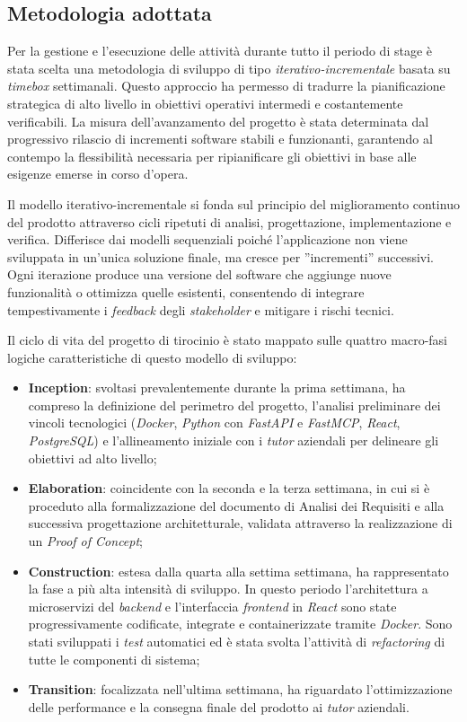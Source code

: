 \subsection{Metodologia adottata}
Per la gestione e l'esecuzione delle attività durante tutto il periodo di stage è stata scelta una metodologia di sviluppo di tipo \textit{iterativo-incrementale} basata su \textit{timebox} settimanali. Questo approccio ha permesso di tradurre la pianificazione strategica di alto livello in obiettivi operativi intermedi e costantemente verificabili. La misura dell'avanzamento del progetto è stata determinata dal progressivo rilascio di incrementi software stabili e funzionanti, garantendo al contempo la flessibilità necessaria per ripianificare gli obiettivi in base alle esigenze emerse in corso d'opera.

Il modello iterativo-incrementale si fonda sul principio del miglioramento continuo del prodotto attraverso cicli ripetuti di analisi, progettazione, implementazione e verifica. Differisce dai modelli sequenziali poiché l'applicazione non viene sviluppata in un'unica soluzione finale, ma cresce per ''incrementi'' successivi. Ogni iterazione produce una versione del software che aggiunge nuove funzionalità o ottimizza quelle esistenti, consentendo di integrare tempestivamente i \textit{feedback} degli \textit{stakeholder} e mitigare i rischi tecnici.

Il ciclo di vita del progetto di tirocinio è stato mappato sulle quattro macro-fasi logiche caratteristiche di questo modello di sviluppo:
\begin{itemize}
\item \textbf{Inception}: svoltasi prevalentemente durante la prima settimana, ha compreso la definizione del perimetro del progetto, l'analisi preliminare dei vincoli tecnologici (\textit{Docker}, \textit{Python} con \textit{FastAPI} e \textit{FastMCP}, \textit{React}, \textit{PostgreSQL}) e l'allineamento iniziale con i \textit{tutor} aziendali per delineare gli obiettivi ad alto livello;
\item \textbf{Elaboration}: coincidente con la seconda e la terza settimana, in cui si è proceduto alla formalizzazione del documento di Analisi dei Requisiti e alla successiva progettazione architetturale, validata attraverso la realizzazione di un \textit{Proof of Concept};
\item \textbf{Construction}: estesa dalla quarta alla settima settimana, ha rappresentato la fase a più alta intensità di sviluppo. In questo periodo l'architettura a microservizi del \textit{backend} e l'interfaccia \textit{frontend} in \textit{React} sono state progressivamente codificate, integrate e containerizzate tramite \textit{Docker}. Sono stati sviluppati i \textit{test} automatici ed è stata svolta l'attività di \textit{refactoring} di tutte le componenti di sistema;
\item \textbf{Transition}: focalizzata nell'ultima settimana, ha riguardato l'ottimizzazione delle performance e la consegna finale del prodotto ai \textit{tutor} aziendali.
\end{itemize}

